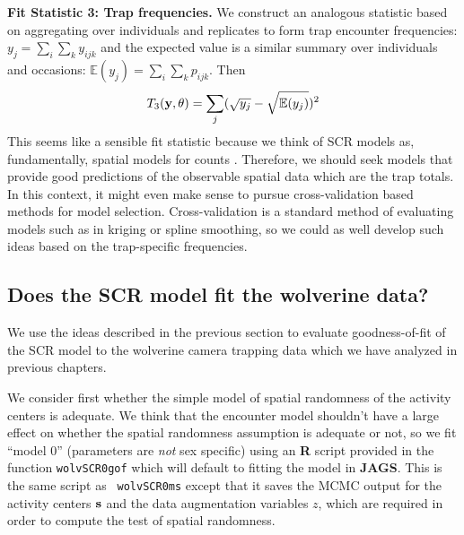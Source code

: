 {\bf Fit Statistic 3: Trap frequencies. } We construct an analogous
statistic based on aggregating over individuals and replicates to form
trap encounter frequencies: $y_{j} = \sum_{i} \sum_{k} y_{ijk}$
\citep{gopalaswamy_etal:2012ecol} and the expected value is a similar
summary over individuals and occasions: $\mathbb{E}(y_{j}) = \sum_{i}
\sum_{k} p_{ijk}$.  Then
\[
 T_{3}({\bf y}, \theta) = \sum_{j} (\sqrt{ y_{j} } - \sqrt{ \mathbb{E}(y_{j}) })^2
\]
This seems like a sensible fit statistic because we think of SCR
models as, fundamentally, spatial models for counts
\citep{chandler_royle:2012}. Therefore, we should seek models that
provide good predictions of the observable spatial data which are the
trap totals.  In this context, it might even make sense to pursue
cross-validation based methods for model selection.  Cross-validation
is a standard method of evaluating models such as in kriging or spline
smoothing, so we could as well develop such ideas based on the
trap-specific frequencies.


\subsection{Does the SCR model fit the wolverine data?}


We use the ideas described in the previous section to evaluate
goodness-of-fit of the SCR model to the wolverine camera trapping data
which we have analyzed in previous chapters.

We consider first whether the simple model of spatial randomness of
the activity centers is adequate.  We think that the
 encounter model shouldn't have a large  effect on
whether the spatial randomness assumption is adequate or not, so we
fit ``model 0'' (parameters are {\it not} sex specific)
using an {\bf R} script provided
in the function \mbox{\tt wolvSCR0gof} which will default to fitting
the model in {\bf JAGS}.  This is the same script as \mbox{\tt
  wolvSCR0ms} except that it saves the MCMC output for the activity
centers ${\bf s}$ and the data augmentation variables $z$, which are
required in order to compute the test of spatial randomness.

